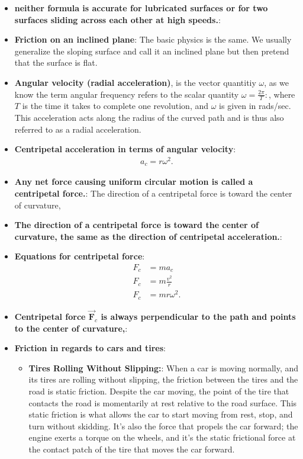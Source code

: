 \documentclass{report}
\begin{document}
\begin{itemize}
                \item \textbf{neither formula is accurate for lubricated surfaces or for two surfaces sliding across each other at high speeds.}:
                \item \textbf{Friction on an inclined plane}:  The basic physics is the same. We usually generalize the sloping surface and call it an inclined plane but then pretend that the surface is flat.
                \item \textbf{Angular velocity (radial acceleration)}, is the vector quantitiy $\omega$, as we know the term angular frequency refers to the scalar quantity $\omega = \frac{2\pi}{T}:$, where $T$ is the time it takes to complete one revolution, and $\omega$ is given in rads/sec. This acceleration acts along the radius of the curved path and is thus also referred to as a radial acceleration.
                \item \textbf{Centripetal acceleration in terms of angular velocity}:
                    \begin{align*}
                        a_{c} = r\omega^{2}
                    .\end{align*}
                \item \textbf{Any net force causing uniform circular motion is called a centripetal force.}: The direction of a centripetal force is toward the center of curvature,
                \item \textbf{The direction of a centripetal force is toward the center of curvature, the same as the direction of centripetal acceleration.}:
                \item \textbf{Equations for centripetal force}:
                    \begin{align*}
                        F_{c} &= ma_{c} \\
                        F_{c} &= m \frac{v^{2}}{r}  \\
                              F_{c}&=mr\omega^{2}
                    .\end{align*}
                \item \textbf{Centripetal force  $\vec{\mathbf{F}}_{c}$ is always perpendicular to the path and points to the center of curvature,}:
                \item \textbf{Friction in regards to cars and tires}:
                    \begin{itemize}
                        \item \textbf{Tires Rolling Without Slipping:}: When a car is moving normally, and its tires are rolling without slipping, the friction between the tires and the road is static friction. Despite the car moving, the point of the tire that contacts the road is momentarily at rest relative to the road surface. This static friction is what allows the car to start moving from rest, stop, and turn without skidding. It's also the force that propels the car forward; the engine exerts a torque on the wheels, and it's the static frictional force at the contact patch of the tire that moves the car forward.

\end{itemize}
\end{itemize}
\end{document}
